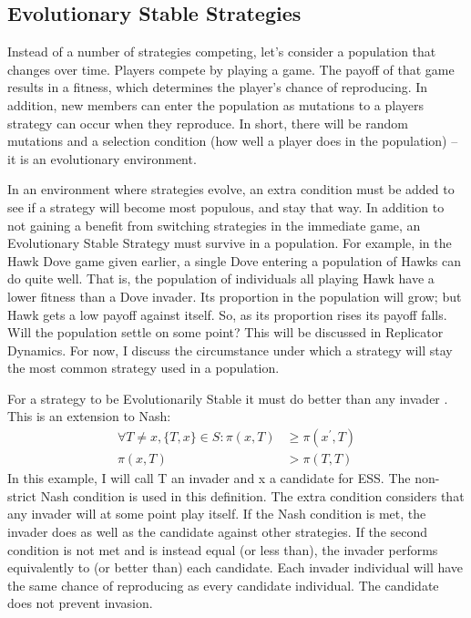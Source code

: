 \documentclass[a4paper,11pt,bcshonoursthesis,singlespace,oneside,thesisdraft,pdflatex]{cssethesis}
\begin{document}
\subsection{Evolutionary Stable Strategies}
Instead of a number of strategies competing, let's consider a population that changes over time. 
Players compete by playing a game. 
The payoff of that game results in a fitness, which determines the player's chance of reproducing. 
In addition, new members can enter the population as mutations to a players strategy can occur when they reproduce. 
In short, there will be random mutations and a selection condition (how well a player does in the population) -- it is an evolutionary environment. 

In an environment where strategies evolve, an extra condition must be added to see if a strategy will become most populous, and stay that way. 
In addition to not gaining a benefit from switching strategies in the immediate game, an Evolutionary Stable Strategy must survive in a population. 
For example, in the Hawk Dove game given earlier, a single Dove entering a population of Hawks can do quite well. 
That is, the population of individuals all playing Hawk have a lower fitness than a Dove invader. 
Its proportion in the population will grow; but Hawk gets a low payoff against itself. 
So, as its proportion rises its payoff falls. 
Will the population settle on some point? This will be discussed in Replicator Dynamics. 
For now, I discuss the circumstance under which a strategy will stay the most common strategy used in a population. 

For a strategy to be Evolutionarily Stable it must do better than any invader \citep[][ch. 2]{weibull1997evolutionary}. 
This is an extension to Nash:
\begin{align*}
\forall T \neq x, \{T,x\} \in S: \pi(x,T)&\geq \pi(x^\prime,T) \\ 
\pi(x, T) &> \pi(T,T)
\end{align*}
In this example, I will call T an invader and x a candidate for ESS. 
The non-strict Nash condition is used in this definition. 
The extra condition considers that any invader will at some point play itself. 
If the Nash condition is met, the invader does as well as the candidate against other strategies. 
If the second condition is not met and is instead equal (or less than), the invader performs equivalently to (or better than) each candidate. Each invader individual will have the same chance of reproducing as every candidate individual. 
The candidate does not prevent invasion. 
\end{document}
